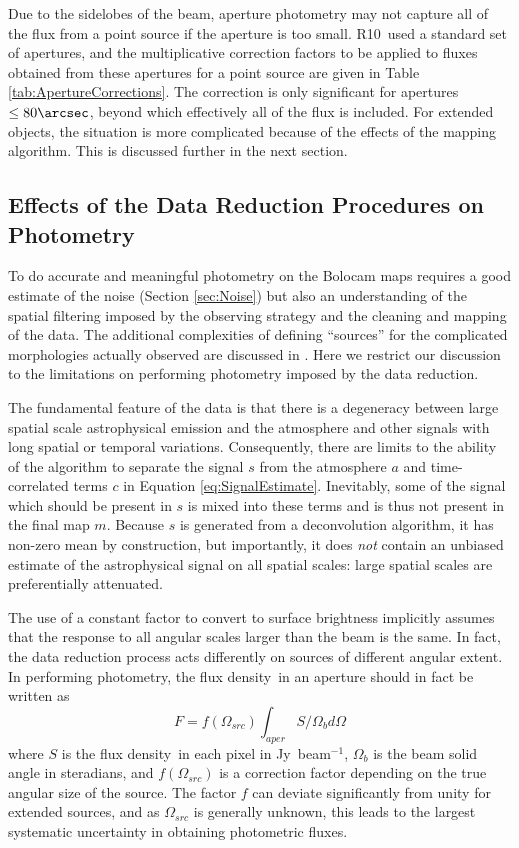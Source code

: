 \documentclass[12pt,preprint]{aastex}
\newcommand{\flux}{flux density}
\newcommand\jyb{Jy~beam$^{-1}$}
\newcommand\Ros{R10}
\begin{document}
Due to the sidelobes of the beam, aperture photometry may not capture
all of the flux from a point source if the aperture is too small.
\Ros\ used a standard set of apertures, and the multiplicative
correction factors to be applied to fluxes obtained from these
apertures for a point source are given in Table
\ref{tab:ApertureCorrections}.  The correction is only significant for
apertures $\le80\arcsec$, beyond which effectively all of the flux is
included.  For extended objects, the situation is more complicated
because of the effects of the mapping algorithm.  This is discussed
further in the next section.

\subsection{Effects of the Data Reduction Procedures on Photometry}
\label{sec:Photometry}

To do accurate and meaningful photometry on the Bolocam maps requires
a good estimate of the noise (Section \ref{sec:Noise}) but also an
understanding of the spatial filtering imposed by the observing
strategy and the cleaning and mapping of the data.  The additional
complexities of defining ``sources'' for the complicated morphologies
actually observed are discussed in \citet{rosolowsky10}.  Here we
restrict our discussion to the limitations on performing photometry
imposed by the data reduction.

The fundamental feature of the data is that there is a degeneracy
between large spatial scale astrophysical emission and the atmosphere
and other signals with long spatial or temporal variations.
Consequently, there are limits to the ability of the algorithm to
separate the signal $s$ from the atmosphere $a$ and time-correlated
terms $c$ in Equation \ref{eq:SignalEstimate}.  Inevitably, some of
the signal which should be present in $s$ is mixed into these terms
and is thus not present in the final map $m$.  Because $s$ is
generated from a deconvolution algorithm, it has non-zero mean by
construction, but importantly, it does {\it not} contain an unbiased
estimate of the astrophysical signal on all spatial scales: large
spatial scales are preferentially attenuated.

The use of a constant factor to convert to surface brightness
implicitly assumes that the response to all angular scales larger than
the beam is the same.  In fact, the data reduction process acts
differently on sources of different angular extent.  In performing
photometry, the \flux\ in an aperture should in fact be written as
\begin{equation}
F = f(\Omega_{src})\int_{aper}{S / \Omega_b d \Omega}
\end{equation}
where $S$ is the \flux\ in each pixel in \jyb, $\Omega_b$ is the beam
solid angle in steradians, and $f(\Omega_{src})$ is a correction
factor depending on the true angular size of the source.  The factor
$f$ can deviate significantly from unity for extended sources, and as
$\Omega_{src}$ is generally unknown, this leads to the largest
systematic uncertainty in obtaining photometric fluxes.
\end{document}

